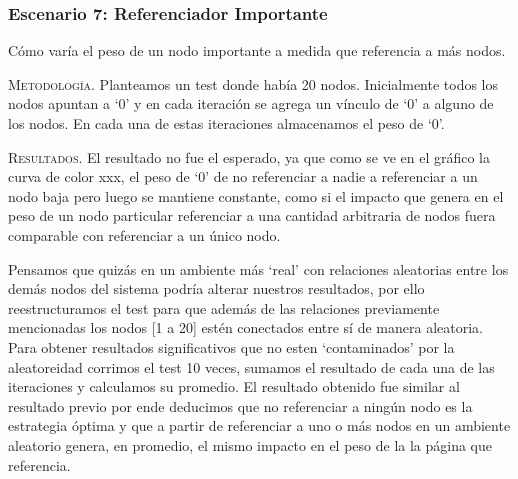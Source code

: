 \vspace{2em}
\subsubsection{Escenario 7: Referenciador Importante} Cómo varía el peso de un nodo importante a medida que referencia a más nodos. 

\vspace{1em}
\noindent \textsc{Metodología}. Planteamos un test donde había 20 nodos. Inicialmente todos los nodos apuntan a `0' y en cada iteración se agrega un vínculo de `0' a alguno de los nodos. 
En cada una de estas iteraciones almacenamos el peso de `0'.

\vspace{1em}
\noindent \textsc{Resultados}. El resultado no fue el esperado, ya que como se ve en el gráfico la curva de color xxx, el peso de `0' de no referenciar a nadie a referenciar a un nodo baja pero luego se mantiene constante, como si el impacto que genera en el peso de un nodo particular referenciar a una cantidad arbitraria de nodos fuera comparable con referenciar a un único nodo. 

Pensamos que quizás en un ambiente más `real' con relaciones aleatorias entre los demás nodos del sistema podría alterar nuestros resultados, por ello reestructuramos el test para que además de las relaciones previamente mencionadas los nodos [1 a 20] estén conectados entre sí de manera aleatoria. Para obtener resultados significativos que no esten `contaminados' por la aleatoreidad corrimos el test 10 veces, sumamos el resultado de cada una de las iteraciones y calculamos su promedio.
El resultado obtenido fue similar al resultado previo por ende deducimos que no referenciar a ningún nodo es la estrategia óptima y que a partir de referenciar a uno o más nodos en un ambiente aleatorio genera, en promedio, el mismo impacto en el peso de la la página que referencia.

